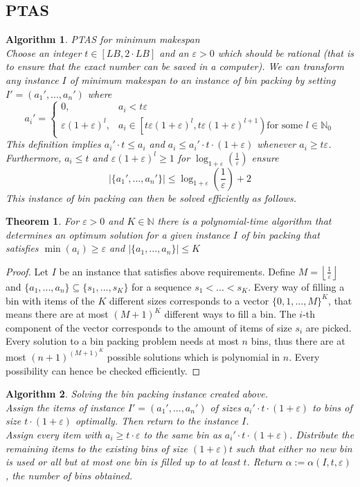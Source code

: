 \documentclass[a4paper, 12pt]{article}
\newtheorem{theorem}{Theorem}[section]
\newtheorem{alg}{Algorithm}[section]
\begin{document}
	\subsection{PTAS}
	\begin{alg}PTAS for minimum makespan\\
		Choose an integer $t \in [LB, 2\cdot LB]$ and an $\varepsilon > 0$ which should be rational (that is to ensure that the exact number can be saved in a computer). We can transform any instance $I$ of minimum makespan to an instance of bin packing by setting $I' = (a_1',...,a_n')$ where \[a_i' = \begin{cases}
			0, & a_i < t \varepsilon\\
			\varepsilon(1+\varepsilon)^l, & a_i \in \left[t \varepsilon(1+\varepsilon)^l, t \varepsilon(1+\varepsilon)^{l+1}\right) \text{for some }l \in \mathbb{N}_0
		\end{cases}\]  
		This definition implies $a_i' \cdot t \leq a_i$ and $a_i \leq a_i' \cdot t \cdot (1+\varepsilon)$ whenever $a_i \geq t \varepsilon$. Furthermore, $a_i \leq t$ and $\varepsilon(1+\varepsilon)^l \geq 1$ for $\log_{1+\varepsilon}\left(\frac{1}{\varepsilon}\right)$ ensure \[\left|\{a_1',...,a_n'\}\right| \leq \log_{1+\varepsilon}\left(\frac{1}{\varepsilon}\right) + 2\]
		This instance of bin packing can then be solved efficiently as follows.
	\end{alg}
	\begin{theorem}
		For $\varepsilon > 0$ and $K \in \mathbb{N}$ there is a polynomial-time algorithm that determines an optimum solution for a given instance $I$ of bin packing that satisfies $\min(a_i) \geq \varepsilon$ and $\left|\{a_1,...,a_n\}\right| \leq K$
	\end{theorem}
	\begin{proof}
		Let $I$ be an instance that satisfies above requirements. Define $M = \left\lfloor\frac{1}{\varepsilon}\right\rfloor$ and $\{a_1,...,a_n\} \subseteq \{s_1,...,s_K\}$ for a sequence $s_1 < ... < s_K$. Every way of filling a bin with items of the $K$ different sizes corresponds to a vector $\{0,1,...,M\}^K$, that means there are at most $(M+1)^K$ different ways to fill a bin. The $i$-th component of the vector corresponds to the amount of items of size $s_i$ are picked. Every solution to a bin packing problem needs at most $n$ bins, thus there are at most $(n+1)^{(M+1)^K}$ possible solutions which is polynomial in $n$. Every possibility can hence be checked efficiently.
	\end{proof}
	\begin{alg} Solving the bin packing instance created above.\\
		\normalfont Assign the items of instance $I' = (a_1',...,a_n')$ of sizes $a_i'\cdot t \cdot (1+\varepsilon)$ to bins of size $t\cdot (1+\varepsilon)$ optimally. Then return to the instance $I$.\\
		Assign every item with $a_i \geq t\cdot \varepsilon$ to the same bin as $a_i'\cdot t \cdot (1+\varepsilon)$. Distribute the remaining items to the existing bins of size $(1+\varepsilon)t$ such that either no new bin is used or all but at most one bin is filled up to at least $t$.
		Return $\alpha := \alpha(I,t,\varepsilon)$, the number of bins obtained.
	\end{alg}
\end{document}
